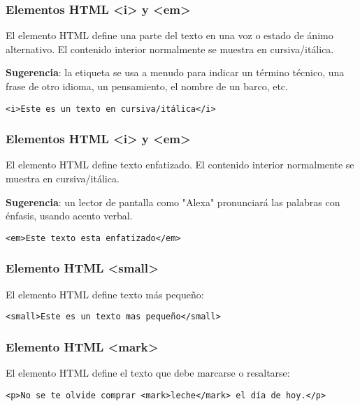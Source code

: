 \begin{frame}[fragile]
  \frametitle{Elementos HTML <i> y <em>}

  El elemento HTML  define una parte del texto en una voz
  o estado de ánimo alternativo. El contenido interior normalmente
  se muestra en cursiva/itálica.

  \vspace{\baselineskip}
  \textbf{Sugerencia}: la  etiqueta se usa a menudo para
  indicar un término técnico, una frase de otro idioma, un
  pensamiento, el nombre de un barco, etc.

  \vspace{\baselineskip}
  \begin{lstlisting}
<i>Este es un texto en cursiva/itálica</i>
  \end{lstlisting}
\end{frame}

\begin{frame}[fragile]
  \frametitle{Elementos HTML <i> y <em>}

  El elemento HTML  define texto enfatizado.
  El contenido interior normalmente se muestra en cursiva/itálica.

  \vspace{\baselineskip}
  \textbf{Sugerencia}: un lector de pantalla como "Alexa"
  pronunciará las palabras  con énfasis, usando acento verbal.

  \vspace{\baselineskip}
  \begin{lstlisting}
<em>Este texto esta enfatizado</em>
  \end{lstlisting}
\end{frame}

\begin{frame}[fragile]
  \frametitle{Elemento HTML <small>}

  El elemento HTML  define texto más pequeño:

  \vspace{\baselineskip}
  \begin{lstlisting}
<small>Este es un texto mas pequeño</small>
  \end{lstlisting}
\end{frame}

\begin{frame}[fragile]
  \frametitle{Elemento HTML <mark>}

  El elemento HTML  define el texto que debe
  marcarse o resaltarse:

  \vspace{\baselineskip}
  \begin{lstlisting}
<p>No se te olvide comprar <mark>leche</mark> el día de hoy.</p>
  \end{lstlisting}
\end{frame}

